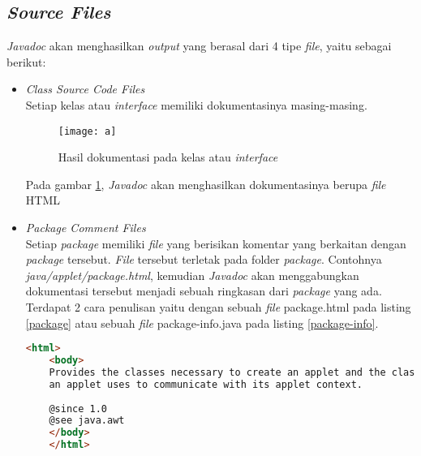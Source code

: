 \subsection{\textit{Source Files}}
\label{sec:source-files}
{\it Javadoc} akan menghasilkan {\it output} yang berasal dari 4 tipe {\it file}, yaitu sebagai berikut:
\begin{itemize}
	\item {\it Class Source Code Files}\\
	Setiap kelas atau {\it interface} memiliki dokumentasinya masing-masing.
	\begin{figure}[H]
	  \centering  
	  \texttt{[image: a]}  
	  \caption[Hasil dokumentasi pada kelas atau {\it interface}]{Hasil dokumentasi pada kelas atau {\it interface}} 
	  \label{fig:a} 
    \end{figure}
    Pada gambar \ref{fig:a}, {\it Javadoc} akan menghasilkan dokumentasinya berupa {\it file} HTML
    
	\item {\it Package Comment Files}\\
	Setiap {\it package} memiliki {\it file} yang berisikan komentar yang berkaitan dengan {\it package} tersebut. {\it File} tersebut terletak pada folder {\it package}. Contohnya {\it java/applet/package.html}, kemudian {\it Javadoc} akan menggabungkan dokumentasi tersebut menjadi sebuah ringkasan dari {\it package} yang ada. 
	Terdapat 2 cara penulisan yaitu dengan sebuah {\it file} package.html pada listing \ref{package} atau sebuah {\it file} package-info.java pada listing \ref{package-info}.
	\begin{lstlisting}[language=Html, caption={\it File package.html}, label={package}]
	<html>
	<body>
	Provides the classes necessary to create an applet and the classes
	an applet uses to communicate with its applet context.
	
	@since 1.0
	@see java.awt
	</body>
	</html>
	\end{lstlisting}
	

\end{itemize}
